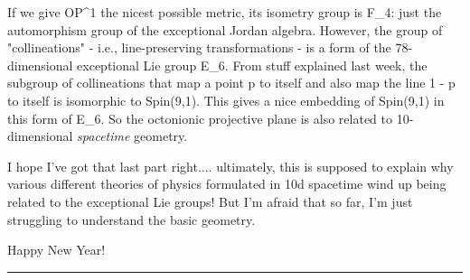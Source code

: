 If we give OP^{1} the nicest possible metric, its isometry group
is F_{4}: just the automorphism group of the exceptional Jordan
algebra.  However, the group of "collineations" - i.e.,
line-preserving transformations - is a form of the 78-dimensional
exceptional Lie group E_{6}.  From stuff explained last week,
the subgroup of collineations that map a point p to itself and also map
the line 1 - p to itself is isomorphic to Spin(9,1).  This gives a nice
embedding of Spin(9,1) in this form of E_{6}.  So the octonionic
projective plane is also related to 10-dimensional \emph{spacetime} 
geometry.

I hope I've got that last part right.... ultimately, this is supposed to
explain why various different theories of physics formulated in 10d
spacetime wind up being related to the exceptional Lie groups!  But I'm
afraid that so far, I'm just struggling to understand the basic geometry.

Happy New Year!



 \par\noindent\rule{\textwidth}{0.4pt}

